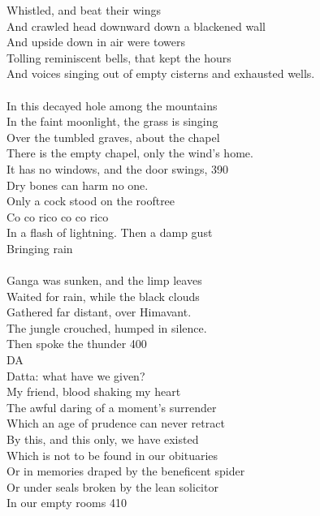 \documentclass{article}
\begin{document}
Whistled, and beat their wings \\
And crawled head downward down a blackened wall \\
And upside down in air were towers \\
Tolling reminiscent bells, that kept the hours \\
And voices singing out of empty cisterns and exhausted wells. \\
 \\
In this decayed hole among the mountains \\
In the faint moonlight, the grass is singing \\
Over the tumbled graves, about the chapel \\
There is the empty chapel, only the wind's home. \\
It has no windows, and the door swings,                         \hfill 390 \\
Dry bones can harm no one. \\
Only a cock stood on the rooftree \\
Co co rico co co rico \\
In a flash of lightning. Then a damp gust \\
Bringing rain \\
 \\
Ganga was sunken, and the limp leaves \\
Waited for rain, while the black clouds \\
Gathered far distant, over Himavant. \\
The jungle crouched, humped in silence. \\
Then spoke the thunder                                          \hfill  400 \\
DA \\
Datta: what have we given? \\
My friend, blood shaking my heart \\
The awful daring of a moment's surrender \\
Which an age of prudence can never retract \\
By this, and this only, we have existed \\
Which is not to be found in our obituaries \\
Or in memories draped by the beneficent spider \\
Or under seals broken by the lean solicitor \\
In our empty rooms                                              \hfill 410 \\
\end{document}
